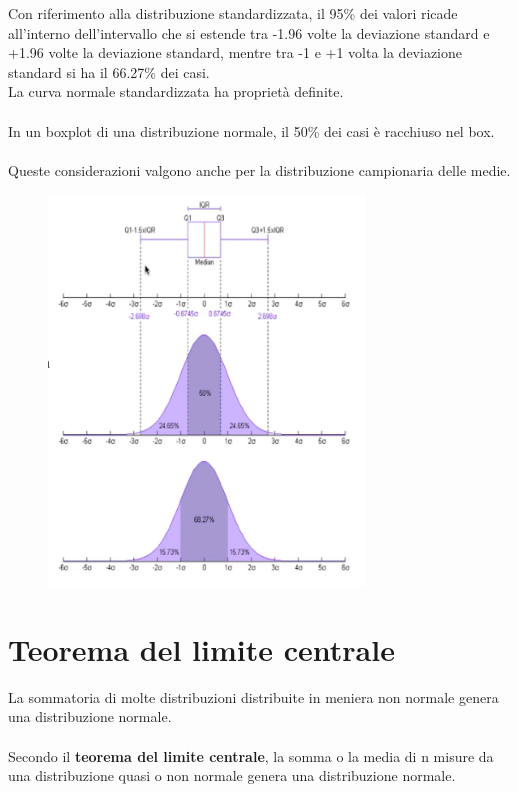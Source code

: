 \documentclass[10pt, draft]{book}
\begin{document}
Con riferimento alla distribuzione standardizzata, il 95\% dei valori ricade all'interno dell'intervallo che si estende tra -1.96 volte la deviazione standard e +1.96 volte la deviazione standard, mentre tra -1 e +1 volta la deviazione standard si ha il 66.27\% dei casi.
\\
La curva normale standardizzata ha proprietà definite.
\\
\\
In un boxplot di una distribuzione normale, il 50\% dei casi è racchiuso nel box.
\\
\\
Queste considerazioni valgono anche per la distribuzione campionaria delle medie.
\clearpage
\begin{figure}[h]\label{standardizednormalcurve2}
    \centering
    \includegraphics[width=0.75\textwidth]{standardizednormalcurve2}
    \caption{\small{}}
\end{figure}

\section{Teorema del limite centrale}
La sommatoria di molte distribuzioni distribuite in meniera non normale genera una distribuzione normale.
\\
\\
Secondo il \textbf{teorema del limite centrale}, la somma o la media di n misure da una distribuzione quasi o non normale genera una distribuzione normale.
\end{document}
